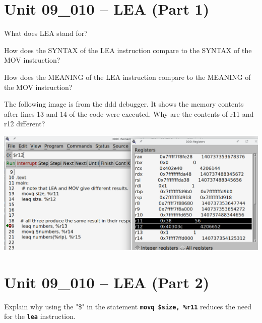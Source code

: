 \documentclass[letterpaper,12pt]{exam}
\newcommand{\unit}{Unit 09}
\begin{document}

\par{\selectfont\textbf{}}
\begin{questions}

\section*{\unit\_010 -- LEA (Part 1)}
\begin{samepage}
    \question What does LEA stand for?
    \vspace{5mm}
\end{samepage}
\par
\begin{samepage}
    \question How does the SYNTAX of the LEA instruction compare to the SYNTAX of the MOV instruction?
    \vspace{5mm}
\end{samepage}
\begin{samepage}
    \question How does the MEANING of the LEA instruction compare to the MEANING of the MOV instruction?
    \vspace{5mm}
\end{samepage}
\par
\begin{samepage}
    \question The following image is from the ddd debugger.  It shows the memory contents after lines 13 and 14 of the code were executed.  Why are the contents of r11 and r12 different?
   \begin{center}
    \includegraphics[width=\textwidth]{../../09_Stack/images/010_LeaVsMov.png}
   \end{center}
   \vspace{5mm}
\end{samepage}
\par
 \section*{\unit\_010 -- LEA (Part 2)}
 \begin{samepage}
     \question Explain why using the "\$" in the statement  \texttt{\textbf{movq \$size, \%r11}} reduces the need for the \texttt{\textbf{lea}} instruction.
     \vspace{5mm}
 \end{samepage}
 \par
  

\end{questions}
\end{document}
